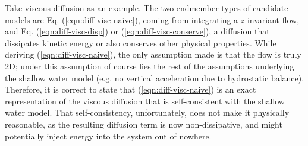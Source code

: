 Take viscous diffusion as an example. The two endmember types of candidate models are Eq. (\ref{eqn:diff-visc-naive}), coming from integrating a $z$-invariant flow, and Eq. (\ref{eqn:diff-visc-disp}) or (\ref{eqn:diff-visc-conserve}), a diffusion that dissipates kinetic energy or also conserves other physical properties. While deriving (\ref{eqn:diff-visc-naive}), the only assumption made is that the flow is truly 2D; under this assumption of course lies the rest of the assumptions underlying the shallow water model (e.g. no vertical acceleration due to hydrostatic balance). Therefore, it is correct to state that (\ref{eqn:diff-visc-naive}) is an exact representation of the viscous diffusion that is self-consistent with the shallow water model. That self-consistency, unfortunately, does not make it physically reasonable, as the resulting diffusion term is now non-dissipative, and might potentially inject energy into the system out of nowhere.

